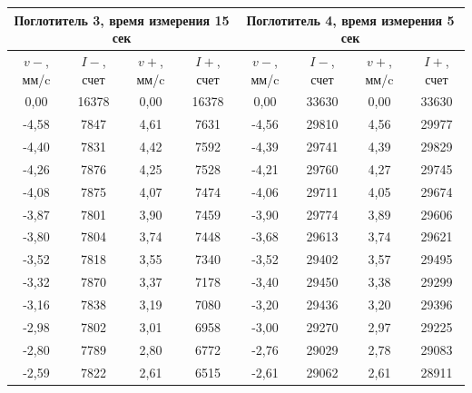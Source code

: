 \documentclass[a4paper, 12pt]{article}
\begin{document}
\begin{table}[h]
\begin{tabular}{|c|c|c|c|c|c|c|c|}
\hline
\multicolumn{4}{|c|}{Поглотитель   3, время измерения 15 сек} & \multicolumn{4}{c|}{Поглотитель   4, время измерения 5 сек} \\ \hline
$v-$, мм/c    & $I-$, счет    & $v+$, мм/c    & $I+$, счет    & $v-$, мм/c    & $I-$, счет    & $v+$, мм/c   & $I+$, счет   \\ \hline
0,00          & 16378         & 0,00          & 16378         & 0,00          & 33630         & 0,00         & 33630        \\ \hline
-4,58         & 7847          & 4,61          & 7631          & -4,56         & 29810         & 4,56         & 29977        \\ \hline
-4,40         & 7831          & 4,42          & 7592          & -4,39         & 29741         & 4,39         & 29829        \\ \hline
-4,26         & 7876          & 4,25          & 7528          & -4,21         & 29760         & 4,27         & 29745        \\ \hline
-4,08         & 7875          & 4,07          & 7474          & -4,06         & 29711         & 4,05         & 29674        \\ \hline
-3,87         & 7801          & 3,90          & 7459          & -3,90         & 29774         & 3,89         & 29606        \\ \hline
-3,80         & 7804          & 3,74          & 7448          & -3,68         & 29613         & 3,74         & 29621        \\ \hline
-3,52         & 7818          & 3,55          & 7340          & -3,52         & 29402         & 3,57         & 29495        \\ \hline
-3,32         & 7870          & 3,37          & 7178          & -3,40         & 29450         & 3,38         & 29299        \\ \hline
-3,16         & 7838          & 3,19          & 7080          & -3,20         & 29436         & 3,20         & 29396        \\ \hline
-2,98         & 7802          & 3,01          & 6958          & -3,00         & 29270         & 2,97         & 29225        \\ \hline
-2,80         & 7789          & 2,80          & 6772          & -2,76         & 29029         & 2,78         & 29083        \\ \hline
-2,59         & 7822          & 2,61          & 6515          & -2,61         & 29062         & 2,61         & 28911        \\ \hline

\end{tabular}
\end{table}
\end{document}
